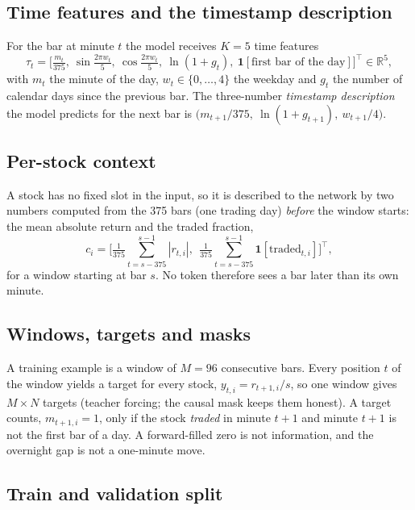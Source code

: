 \documentclass[11pt]{article}
\newcommand{\R}{\mathbb{R}}
\begin{document}
\subsection{Time features and the timestamp description}

For the bar at minute $t$ the model receives $K{=}5$ time features
\begin{equation}
  \tau_t = \Big[\tfrac{m_t}{375},\ \sin\tfrac{2\pi w_t}{5},\ \cos\tfrac{2\pi w_t}{5},\ \ln(1+g_t),\ \mathbf 1[\text{first bar of the day}]\Big]^{\top}\in\R^{5},
\end{equation}
with $m_t$ the minute of the day, $w_t\in\{0,\dots,4\}$ the weekday and $g_t$ the number of calendar days since the
previous bar. The three-number \emph{timestamp description} the model predicts for the next bar is $\big(m_{t+1}/375,\ \ln(1+g_{t+1}),\ w_{t+1}/4\big)$.

\subsection{Per-stock context}

A stock has no fixed slot in the input, so it is described to the network by two numbers computed from the 375
bars (one trading day) \emph{before} the window starts: the mean absolute return and the traded fraction,
\begin{equation}
  c_i=\Big[\tfrac1{375}\sum_{t=s-375}^{s-1}|r_{t,i}|,\ \ \tfrac1{375}\sum_{t=s-375}^{s-1}\mathbf 1[\text{traded}_{t,i}]\Big]^{\top},
\end{equation}
for a window starting at bar $s$. No token therefore sees a bar later than its own minute.

\subsection{Windows, targets and masks}

A training example is a window of $M{=}96$ consecutive bars. Every position $t$ of the window yields a target for
every stock, $y_{t,i}=r_{t+1,i}/s$, so one window gives $M\times N$ targets (teacher forcing; the causal mask keeps them
honest). A target counts, $m_{t+1,i}=1$, only if the stock \emph{traded} in minute $t{+}1$ and minute $t{+}1$ is not the first
bar of a day. A forward-filled zero is not information, and the overnight gap is not a one-minute move.

\subsection{Train and validation split}\label{sec:split}
\end{document}
